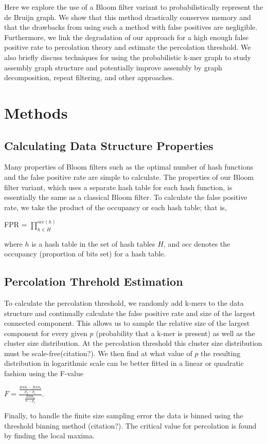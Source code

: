 \documentclass[12pt]{article} \usepackage{simplemargins}
\begin{document}
Here we explore the use of a Bloom filter variant to probabilistically
represent the de Bruijn graph. We show that this method drastically
conserves memory and that the drawbacks from using such a method 
with false positives are negligible. Furthermore, we link the degradation 
of our approach for a high enough false positive rate to percolation 
theory and estimate the percolation threshold. We also briefly
discuss techniques for using the probabilistic k-mer graph to study 
assembly graph structure and potentially improve assembly by 
graph decomposition, repeat filtering, and other approaches.

\section{Methods}

\subsection{Calculating Data Structure Properties}
Many properties of Bloom filters such as the optimal number of hash functions 
and the false positive rate are simple to calculate. The properties 
of our Bloom filter variant, which 
uses a separate hash table for each hash function, is essentially the 
same as a classical Bloom filter. To calculate the false positive rate, we 
take the product of the occupancy or each hash table; that is,
\begin{center}
FPR = $\prod_{h \in H}^{occ(h)}$
\end{center}
where $h$ is a hash table in the set of hash tables $H$, and $occ$ denotes 
the occupancy (proportion of bits set) for a hash table.

\subsection{Percolation Threhold Estimation}
To calculate the percolation threshold, we randomly add k-mers to the data structure 
and continually calculate the false positive rate and size of the largest connected 
component. This allows us to sample the relative size of the largest component for every 
given $p$ (probability that a k-mer is present) as well as the cluster size distribution. 
At the percolation threshold this cluster size distribution must be scale-free(citation?). 
We then find at what value of $p$ the resulting 
distribution in logarithmic 
scale can be better fitted in a linear or quadratic fashion using 
the F-value
\newline
\newline
\begin{center}
$F=\frac{\frac{RSS_1-RSS_2}{p_2-p_1}}{\frac{RSS_2}{n-p_2}}$.
\end{center}
Finally, to handle the finite size sampling error the data is binned using the 
threshold binning method (citation?). The critical value for percolation is found 
by finding the local maxima.
\end{document}
